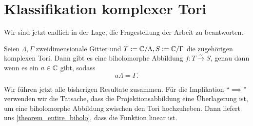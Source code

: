 \section{Klassifikation komplexer Tori}
Wir sind jetzt endlich in der Lage, die Fragestellung der Arbeit zu beantworten.

\begin{theorem}
	Seien \(\Lambda,\Gamma\) zweidimensionale Gitter und \(T:=\mathbb{C}/\Lambda, S:=\mathbb{C}/\Gamma\) die zugehörigen komplexen Tori. Dann gibt es eine biholomorphe Abbildung 
	\(f:T\xrightarrow{\sim} S\), genau dann wenn es ein \(a\in \mathbb{C}\) gibt, sodass \[a\Lambda=\Gamma.\] 
\end{theorem}
\begin{idea}
	Wir führen jetzt alle bisherigen Resultate zusammen. Für die Implikation \enquote{\(\implies\)} verwenden wir die Tatsache, dass die Projektionsabbildung eine Überlagerung ist, um eine biholomorphe Abbildung zwischen den Tori hochzuheben.
	Dann liefert uns \cref{theorem_entire_biholo}, dass die Funktion linear ist. 
\end{idea}
